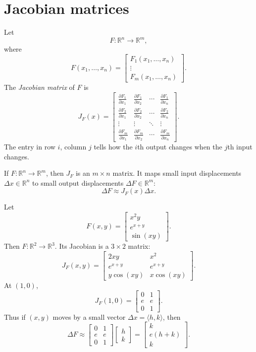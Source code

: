 \documentclass[11pt]{article}
\newcommand{\R}{\mathbb R}
\newcommand{\bmat}[1]{\begin{bmatrix}#1\end{bmatrix}}
\begin{document}
\section{Jacobian matrices}

Let
\[
F:\R^n\to\R^m,
\]
where
\[
F(x_1,\dots,x_n)=\bmat{F_1(x_1,\dots,x_n)\\ \vdots\\ F_m(x_1,\dots,x_n)}.
\]
The \emph{Jacobian matrix} of $F$ is
\[
J_F(x)=
\begin{bmatrix}
\frac{\partial F_1}{\partial x_1} & \frac{\partial F_1}{\partial x_2} & \cdots & \frac{\partial F_1}{\partial x_n}\\
\frac{\partial F_2}{\partial x_1} & \frac{\partial F_2}{\partial x_2} & \cdots & \frac{\partial F_2}{\partial x_n}\\
\vdots & \vdots & \ddots & \vdots\\
\frac{\partial F_m}{\partial x_1} & \frac{\partial F_m}{\partial x_2} & \cdots & \frac{\partial F_m}{\partial x_n}
\end{bmatrix}.
\]
The entry in row $i$, column $j$ tells how the $i$th output changes when the $j$th input changes.

\begin{notebox}
If $F:\R^n\to\R^m$, then $J_F$ is an $m\times n$ matrix. It maps small input displacements $\Delta x\in\R^n$ to small output displacements $\Delta F\in\R^m$:
\[
\Delta F\approx J_F(x)\Delta x.
\]
\end{notebox}

\begin{workedexample}
Let
\[
F(x,y)=\bmat{x^2y\\ e^{x+y}\\ \sin(xy)}.
\]
Then $F:\R^2\to\R^3$. Its Jacobian is a $3\times 2$ matrix:
\[
J_F(x,y)=
\begin{bmatrix}
2xy & x^2\\
e^{x+y} & e^{x+y}\\
y\cos(xy) & x\cos(xy)
\end{bmatrix}.
\]
At $(1,0)$,
\[
J_F(1,0)=\begin{bmatrix}0&1\\ e&e\\ 0&1\end{bmatrix}.
\]
Thus if $(x,y)$ moves by a small vector $\Delta x=\langle h,k\rangle$, then
\[
\Delta F\approx
\begin{bmatrix}0&1\\ e&e\\ 0&1\end{bmatrix}
\begin{bmatrix}h\\k\end{bmatrix}
=\begin{bmatrix}k\\ e(h+k)\\ k\end{bmatrix}.
\]
\end{workedexample}
\end{document}
